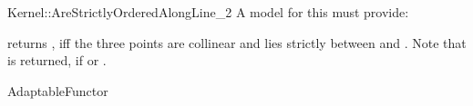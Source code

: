 \begin{ccRefFunctionObjectConcept}{Kernel::AreStrictlyOrderedAlongLine_2}
A model for this must provide:


          {returns , iff the three points are collinear and 
           lies strictly between  and .
          Note that  is returned, if  or
          .}

\ccRefines
AdaptableFunctor

\ccSeeAlso
{}  \\

\end{ccRefFunctionObjectConcept}         

